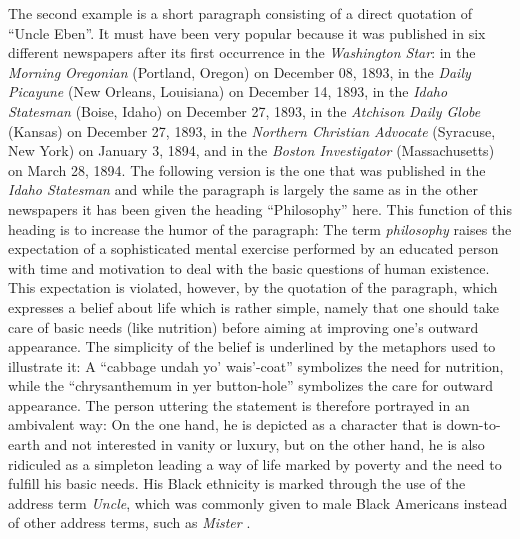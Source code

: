 The second example is a short paragraph consisting of a direct quotation of “Uncle Eben”. It must have been very popular because it was published in six different newspapers after its first occurrence in the \emph{Washington Star}: in the \emph{Morning Oregonian} (Portland, Oregon) on December 08, 1893, in the \emph{Daily Picayune} (New Orleans, Louisiana) on December 14, 1893, in the \emph{Idaho Statesman} (Boise, Idaho) on December 27, 1893, in the \emph{Atchison Daily Globe} (Kansas) on December 27, 1893, in the \emph{Northern Christian Advocate} (Syracuse, New York) on January 3, 1894, and in the \emph{Boston Investigator} (Massachusetts) on March 28, 1894. The following version is the one that was published in the \emph{Idaho Statesman} and while the paragraph is largely the same as in the other newspapers it has been given the heading “Philosophy” here. This function of this heading is to increase the humor of the paragraph: The term \emph{philosophy} raises the expectation of a sophisticated mental exercise performed by an educated person with time and motivation to deal with the basic questions of human existence. This expectation is violated, however, by the quotation of the paragraph, which expresses a belief about life which is rather simple, namely that one should take care of basic needs (like nutrition) before aiming at improving one’s outward appearance. The simplicity of the belief is underlined by the metaphors used to illustrate it: A “cabbage undah yo’ wais’-coat” symbolizes the need for nutrition, while the “chrysanthemum in yer button-hole” symbolizes the care for outward appearance. The person uttering the statement is therefore portrayed in an ambivalent way: On the one hand, he is depicted as a character that is down-to-earth and not interested in vanity or luxury, but on the other hand, he is also ridiculed as a simpleton leading a way of life marked by poverty and the need to fulfill his basic needs. His Black ethnicity is marked through the use of the address term \emph{Uncle}, which was commonly given to male Black Americans instead of other address terms, such as \emph{Mister} \citep[10]{Harris2008}.

